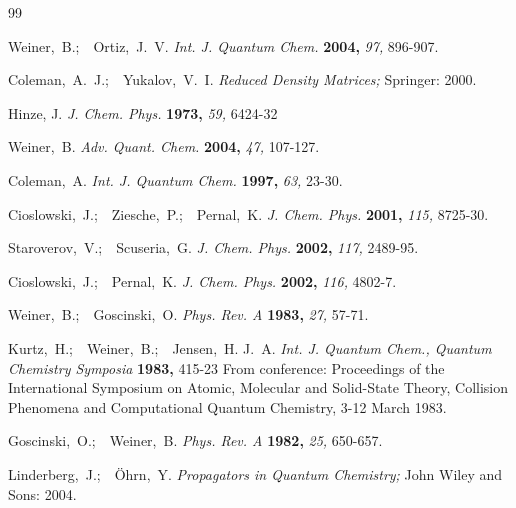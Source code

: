\documentclass[aps,preprint]{revtex4}%
\begin{document}
\begin{thebibliography}{99}                                                                                               %


Weiner,~B.;\ \ Ortiz,~J.~V. \textit{Int. J. Quantum
Chem.} \textbf{2004,} \textsl{97,} 896-907.

Coleman,~A.~J.;\ \ Yukalov,~V.~I. \textit{Reduced Density
Matrices;} Springer: 2000.

Hinze, J. \textit{J. Chem. Phys.} \textbf{1973,} \textsl{59,} 6424-32

Weiner,~B. \textit{Adv. Quant. Chem.} \textbf{2004,}
\textsl{47,} 107-127.

Coleman,~A. \textit{Int. J. Quantum Chem.} \textbf{1997,}
\textsl{63,} 23-30.

Cioslowski,~J.;\ \ Ziesche,~P.;\ \ Pernal,~K.
\textit{J. Chem. Phys.} \textbf{2001,} \textsl{115,} 8725-30.

Staroverov,~V.;\ \ Scuseria,~G. \textit{J. Chem. Phys.}
\textbf{2002,} \textsl{117,} 2489-95.

Cioslowski,~J.;\ \ Pernal,~K. \textit{J. Chem. Phys.}
\textbf{2002,} \textsl{116,} 4802-7.

Weiner,~B.;\ \ Goscinski,~O. \textit{Phys. Rev. A}
\textbf{1983,} \textsl{27,} 57-71.

Kurtz,~H.;\ \ Weiner,~B.;\ \ Jensen,~H. J.~A. \textit{Int.
J. Quantum Chem., Quantum Chemistry Symposia} \textbf{1983,} 415-23 From
conference: Proceedings of the International Symposium on Atomic, Molecular
and Solid-State Theory, Collision Phenomena and Computational Quantum
Chemistry, 3-12 March 1983.

Goscinski,~O.;\ \ Weiner,~B. \textit{Phys. Rev. A}
\textbf{1982,} \textsl{25,} 650-657.

Linderberg,~J.;\ \ {\"{O}}hrn,~Y. \textit{Propagators in
Quantum Chemistry;} John Wiley and Sons: 2004.
\end{thebibliography}
\end{document}
